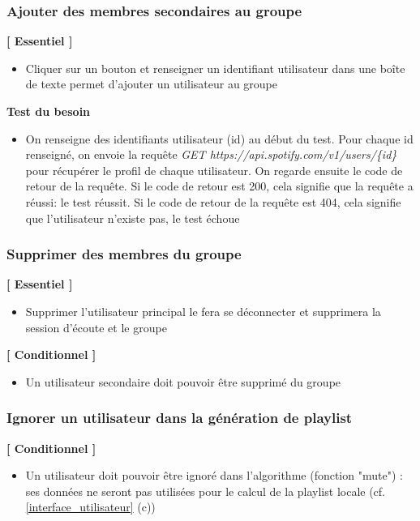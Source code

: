 \documentclass{article}
\begin{document}
		\subsubsection{Ajouter des membres secondaires au groupe}  \label{connexion}
		\textbf{[ Essentiel ]}
		\begin{itemize}
			\item Cliquer sur un bouton et renseigner un identifiant utilisateur dans une boîte de texte permet d'ajouter un utilisateur au groupe
		\end{itemize}
		\textbf{Test du besoin} 
		\begin{itemize}
			\item On renseigne des identifiants utilisateur (id) au début du test. Pour chaque id renseigné, on envoie la requête \textit{GET https://api.spotify.com/v1/users/\{id\}} pour récupérer le profil de chaque utilisateur. On regarde ensuite le code de retour de la requête. Si le code de retour est 200, cela signifie que la requête a réussi: le test réussit. Si le code de retour de la requête est 404, cela signifie que l'utilisateur n'existe pas, le test échoue
		\end{itemize}
		\subsubsection{Supprimer des membres du groupe}
		\textbf{[ Essentiel ]}
		\begin{itemize}
			\item Supprimer l'utilisateur principal le fera se déconnecter et supprimera la session d'écoute et le groupe
		\end{itemize}
		\textbf{[ Conditionnel ]}
		\begin{itemize}
			\item Un utilisateur secondaire doit pouvoir être supprimé du groupe
		\end{itemize}
						            
		\subsubsection{Ignorer un utilisateur dans la génération de playlist}
		\textbf{[ Conditionnel ]}
		\begin{itemize}
			\item Un utilisateur doit pouvoir être ignoré dans l'algorithme (fonction "mute") : ses données ne seront pas utilisées pour le calcul de la playlist locale (cf. \ref{interface_utilisateur} (c))
		\end{itemize}
\end{document}
